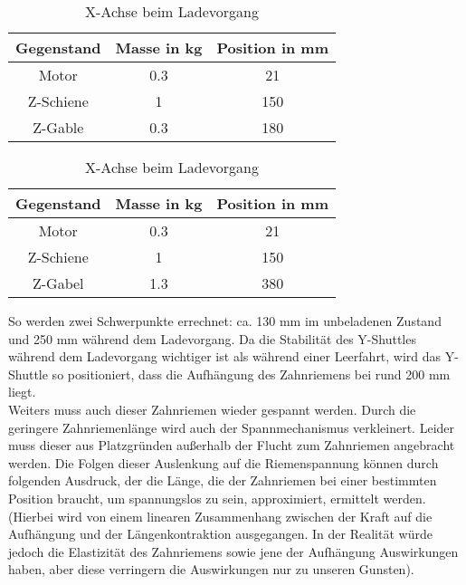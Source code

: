 \begin{table}[H]
    \centering
    \centering
        \begin{tabular}{c c c}
            Gegenstand & Masse in kg & Position in mm\\
            \hline
            Motor & 0.3 & 21 \\
            Z-Schiene & 1 & 150 \\
            Z-Gable & 0.3 & 180 
        \end{tabular}
    \caption{X-Achse unbeladen und eingefahren}
        \vspace{5mm}
        \centering
        \begin{tabular}{c c c}
            Gegenstand & Masse in kg & Position in mm\\ 
            \hline
            Motor & 0.3 & 21 \\
            Z-Schiene & 1 & 150 \\
            Z-Gabel & 1.3 & 380
        \end{tabular}
        \caption{X-Achse beim Ladevorgang}
\end{table}
So werden zwei Schwerpunkte errechnet: ca. 130 mm im unbeladenen Zustand und 250 mm während dem Ladevorgang. Da die Stabilität des Y-Shuttles während dem Ladevorgang wichtiger ist als während einer Leerfahrt, wird das Y-Shuttle so positioniert, dass die Aufhängung des Zahnriemens bei rund 200 mm liegt.\\
Weiters muss auch dieser Zahnriemen wieder gespannt werden. Durch die geringere Zahnriemenlänge wird auch der Spannmechanismus verkleinert.
Leider muss dieser aus Platzgründen außerhalb der Flucht zum Zahnriemen angebracht werden. Die Folgen dieser Auslenkung auf die Riemenspannung können durch folgenden Ausdruck, der die Länge, die der Zahnriemen bei einer bestimmten Position braucht, um spannungslos zu sein, approximiert, ermittelt werden. (Hierbei wird von einem linearen Zusammenhang zwischen der Kraft auf die Aufhängung und der Längenkontraktion ausgegangen. In der Realität würde jedoch die Elastizität des Zahnriemens sowie jene der Aufhängung Auswirkungen haben, aber diese verringern die Auswirkungen nur zu unseren Gunsten).
    \vspace{4mm}
